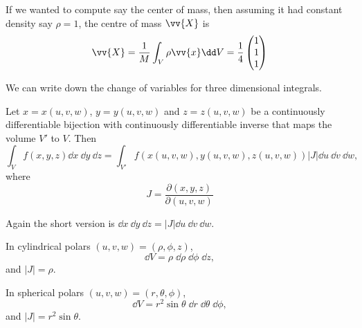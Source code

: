 \begin{example}
If we wanted to compute say the center of mass, then assuming it had constant density say $\rho = 1$, the centre of mass $\vv{X}$ is
$$
\vv{X} = \frac{1}{M} \int_V \rho \vv{x} \dd V = \frac{1}{4}\begin{pmatrix}
	1\\ 1\\ 1
\end{pmatrix}
$$
\end{example}

We can write down the change of variables for three dimensional integrals.

\begin{proposition}
	Let $x = x(u, v, w)$, $y = y(u, v, w)$ and $z = z(u, v, w)$ be a continuously differentiable bijection with continuously differentiable inverse that maps the volume $V'$ to $V$. Then
	$$
	\int_V f(x, y, z) \dd x \ \dd y \ \dd z = \int_{V'} f(x(u, v, w), y(u, v, w), z(u, v, w)) |J| \dd u\  \dd v\ \dd w,
	$$
	where
	$$
	J = \frac{\partial(x, y, z)}{\partial(u, v, w)}
	$$
\end{proposition}
Again the short version is $\dd x\ \dd y\ \dd z = |J| \dd u\ \dd v\ \dd w$.

\begin{example}
	In cylindrical polars $(u, v, w) = (\rho, \phi, z)$,
	$$
	\dd V = \rho \; \dd\rho \; \dd \phi \; \dd z,
	$$
	and $|J| = \rho$.

	In spherical polars $(u, v, w) = (r, \theta, \phi)$,
	$$
	\dd V = r^2 \sin \theta \; \dd r \; \dd \theta \; \dd \phi,
	$$
	and $|J| = r^2 \sin \theta$.
\end{example}

